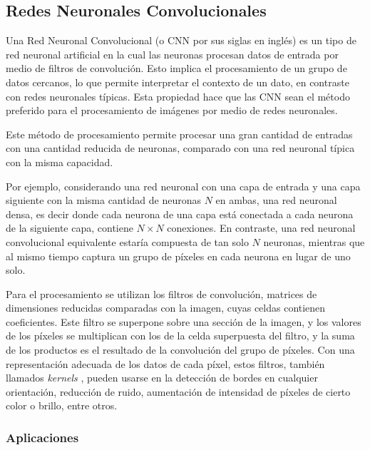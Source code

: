 \subsection{Redes Neuronales Convolucionales}

Una Red Neuronal Convolucional (o CNN por sus siglas en inglés) es un tipo de red neuronal artificial en la cual las
neuronas procesan datos de entrada por medio de filtros de convolución. Esto implica el procesamiento de un grupo de
datos cercanos, lo que permite interpretar el contexto de un dato, en contraste con redes neuronales típicas. Esta
propiedad hace que las CNN sean el método preferido para el procesamiento de imágenes por medio de redes neuronales.
\autocite{hands-on-machine-learning} \autocite{ciresan-cnn}

Este método de procesamiento permite procesar una gran cantidad de entradas con una cantidad reducida de neuronas,
comparado con una red neuronal típica con la misma capacidad.

Por ejemplo, considerando una red neuronal con una capa de entrada y una capa siguiente con la misma cantidad de
neuronas $N$ en ambas, una red neuronal densa, es decir donde cada neurona de una capa está conectada a cada neurona de
la siguiente capa, contiene $N \times N$ conexiones. En contraste, una red neuronal convolucional equivalente estaría
compuesta de tan solo $N$ neuronas, mientras que al mismo tiempo captura un grupo de píxeles en cada neurona en lugar
de uno solo.

Para el procesamiento se utilizan los filtros de convolución, matrices de dimensiones reducidas comparadas con la
imagen, cuyas celdas contienen coeficientes. Este filtro se superpone sobre una sección de la imagen, y los valores de
los píxeles se multiplican con los de la celda superpuesta del filtro, y la suma de los productos es el resultado de la
convolución del grupo de píxeles. Con una representación adecuada de los datos de cada píxel, estos filtros, también
llamados {\it kernels }, pueden usarse en la detección de bordes en cualquier orientación, reducción de ruido,
aumentación de intensidad de píxeles de cierto color o brillo, entre otros. \autocite{ciresan-cnn}


\subsubsection{Aplicaciones}

